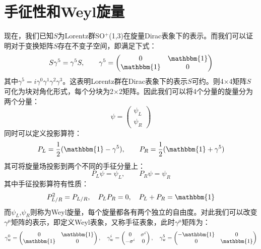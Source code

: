 \section{手征性和Weyl旋量}
现在，我们已知$S$为Lorentz群SO$^+$(1,3)在旋量Dirac表象下的表示。而我们可以证明对于变换矩阵$S$存在不变子空间，即满足下式：
\begin{equation}
S\gamma^5=\gamma^5 S,\qquad \gamma^5=\begin{pmatrix}
0&	\mathbbm{1}\\
\mathbbm{1}&	0
\end{pmatrix}
\end{equation}
其中$\gamma^5=i\gamma^0\gamma^1\gamma^2\gamma^3$。这表明Lorentz群在Dirac表象下的表示$S$可约。则4$\times$4矩阵$S$可化为块对角化形式，每个分块为2$\times$2矩阵。因此我们可以将4个分量的旋量分为两个分量：
\begin{equation}
\psi=\begin{pmatrix}
\psi_{L}\\
\psi_{R}
\end{pmatrix}
\end{equation}
同时可以定义投影算符：
\begin{equation}
P_{L}=\frac{1}{2}(\mathbbm{1}-\gamma^5),\qquad P_R=\frac{1}{2}(\mathbbm{1}+\gamma^5)
\end{equation}
其可将旋量场投影到两个不同的手征分量上：
\begin{equation}
P_{L}\psi=\psi_L,\qquad	P_R\psi=\psi_{R}
\end{equation}
其中手征投影算符有性质：
\begin{equation}
P_{L/R}^2=P_{L/R},\quad P_{L}P_{R}=0,\quad P_L+P_R=\mathbbm{1}
\end{equation}
而$\psi_L$,$\psi_R$则称为Weyl旋量，每个旋量都各有两个独立的自由度。对此我们可以改变$\gamma^\mu$矩阵的表示，即定义Weyl表象，又称手征表象，此时$\gamma^\mu$矩阵为：
\begin{equation}
\gamma^0_\mathrm{w}=\begin{pmatrix}
0&	\mathbbm{1}\\
\mathbbm{1}&	0
\end{pmatrix},\quad\gamma^i_\mathrm{w}=\begin{pmatrix}
0&	\sigma^i\\
-\sigma^i&	0
\end{pmatrix},\quad\gamma^5_\mathrm{w}=\begin{pmatrix}
-\mathbbm{1}&	0\\
0&	\mathbbm{1}
\end{pmatrix}
\end{equation}
